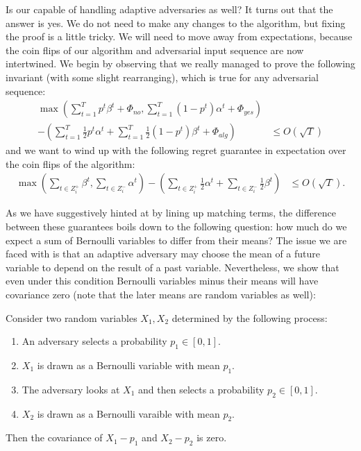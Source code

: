 \documentclass[final,12pt]{colt2018}
\newcommand{\Yes}[1][i]{Z^+_{#1}}
\newcommand{\No}[1][i]{Z^-_{#1}}
\newcommand{\Potential}{\Phi}
\newcommand{\PotentialAlg}{\Potential_{alg}}
\newcommand{\PotentialYes}{\Potential_{yes}}
\newcommand{\PotentialNo}{\Potential_{no}}
\begin{document}
Is our \OptSubroutine{} capable of handling adaptive adversaries as well? It turns out that the answer is yes. We do not need to make any changes to the algorithm, but fixing the proof is a little tricky. We will need to move away from expectations, because the coin flips of our algorithm and adversarial input sequence are now intertwined. We begin by observing that we really managed to prove the following invariant (with some slight rearranging), which is true for any adversarial sequence:
\begin{align*}
  \max \left( \sum_{t=1}^T p^t \beta^t + \PotentialNo, \sum_{t=1}^T (1 - p^t) \alpha^t + \PotentialYes \right) \\
    - \left( \sum_{t=1}^T \frac12 p^t \alpha^t + \sum_{t=1}^T \frac12 (1 - p^t) \beta^t + \PotentialAlg \right)
    &\le O(\sqrt{T})
\end{align*}
and we want to wind up with the following regret guarantee in expectation over the coin flips of the algorithm:
\begin{align*}
  \max \left( \sum_{t \in \Yes} \beta^t, \sum_{t \in \No} \alpha^t \right)
    - \left( \sum_{t \in \Yes} \frac12 \alpha^t + \sum_{t \in \No} \frac12 \beta^t \right)
    &\le O(\sqrt{T}).
\end{align*}

As we have suggestively hinted at by lining up matching terms, the difference between these guarantees boils down to the following question: how much do we expect a sum of Bernoulli variables to differ from their means? The issue we are faced with is that an adaptive adversary may choose the mean of a future variable to depend on the result of a past variable. Nevertheless, we show that even under this condition Bernoulli variables minus their means will have covariance zero (note that the later means are random variables as well):
\begin{lemma}
\label{lem:covariance}
  Consider two random variables $X_1, X_2$ determined by the following process:
  \begin{enumerate}
    \item An adversary selects a probability $p_1 \in [0, 1]$.
    \item $X_1$ is drawn as a Bernoulli variable with mean $p_1$.
    \item The adversary looks at $X_1$ and then selects a probability $p_2 \in [0, 1]$.
    \item $X_2$ is drawn as a Bernoulli varaible with mean $p_2$.
  \end{enumerate}
  Then the covariance of $X_1 - p_1$ and $X_2 - p_2$ is zero.
\end{lemma}
\end{document}

